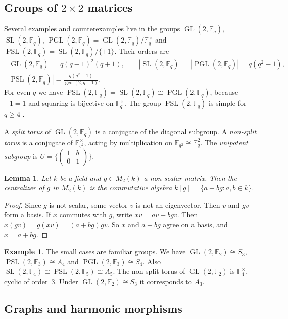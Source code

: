 \documentclass[12pt,letterpaper]{article}
\numberwithin{equation}{section}
\theoremstyle{plain}
\newtheorem{lemma}[theorem]{Lemma}
\theoremstyle{definition}
\newtheorem{example}[theorem]{Example}
\newcommand{\F}{\mathbb{F}}
\DeclareMathOperator{\GL}{GL}
\DeclareMathOperator{\SL}{SL}
\DeclareMathOperator{\PGL}{PGL}
\DeclareMathOperator{\PSL}{PSL}
\begin{document}
\subsection{\texorpdfstring{Groups of $2\times2$ matrices}{Groups of 2x2 matrices}}\label{sec:gl2}

Several examples and counterexamples live in the groups $\GL(2,\F_q)$,
$\SL(2,\F_q)$, $\PGL(2,\F_q)=\GL(2,\F_q)/\F_q^\times$ and
$\PSL(2,\F_q)=\SL(2,\F_q)/\{\pm1\}$. Their orders are
\begin{gather*}
|\GL(2,\F_q)|=q(q-1)^2(q+1),\qquad |\SL(2,\F_q)|=|\PGL(2,\F_q)|=q(q^2-1),\\
|\PSL(2,\F_q)|=\frac{q(q^2-1)}{\gcd(2,q-1)}.
\end{gather*}
For even $q$ we have $\PSL(2,\F_q)=\SL(2,\F_q)\cong\PGL(2,\F_q)$, because
$-1=1$ and squaring is bijective on $\F_q^\times$. The group
$\PSL(2,\F_q)$ is simple for $q\ge4$ \cite[Ch.~8]{Ro95}.

A \emph{split torus} of $\GL(2,\F_q)$ is a conjugate of the diagonal
subgroup. A \emph{non-split torus} is a conjugate of $\F_{q^2}^\times$,
acting by multiplication on $\F_{q^2}\cong\F_q^2$. The \emph{unipotent
subgroup} is $U=\{\left(\begin{smallmatrix}1&b\\0&1\end{smallmatrix}\right)
\}$.

\begin{lemma}\label{lem:cyclicvector}
Let $k$ be a field and $g\in M_2(k)$ a non-scalar matrix. Then the
centralizer of $g$ in $M_2(k)$ is the commutative algebra
$k[g]=\{a+bg: a,b\in k\}$.
\end{lemma}

\begin{proof}
Since $g$ is not scalar, some vector $v$ is not an eigenvector. Then $v$ and
$gv$ form a basis. If $x$ commutes with $g$, write $xv=av+bgv$. Then
$x(gv)=g(xv)=(a+bg)gv$. So $x$ and $a+bg$ agree on a basis, and $x=a+bg$.
\end{proof}

\begin{example}\label{ex:smallgl}
The small cases are familiar groups. We have $\GL(2,\F_2)\cong S_3$,
$\PSL(2,\F_3)\cong A_4$ and $\PGL(2,\F_3)\cong S_4$. Also
$\SL(2,\F_4)\cong\PSL(2,\F_5)\cong A_5$. The non-split torus of
$\GL(2,\F_2)$ is $\F_4^\times$, cyclic of order~$3$. Under $\GL(2,\F_2)\cong
S_3$ it corresponds to $A_3$.
\end{example}

\subsection{Graphs and harmonic morphisms}\label{sec:harmbg}
\end{document}
